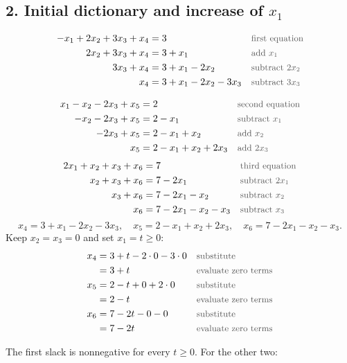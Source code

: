 \documentclass[a4paper,11pt]{article}
\newif\ifexplain
\newcommand{\teil}[1]{\subsection*{#1}}
\newcommand{\why}[1]{\text{\small\color{black!65}#1}}
\newcommand{\explain}[1]{\ifexplain\begin{erklbox}#1\end{erklbox}\fi}
\begin{document}
\teil{2. Initial dictionary and increase of $x_1$}
\begin{align*}
-x_1+2x_2+3x_3+x_4&=3&&\why{first equation}\\
2x_2+3x_3+x_4&=3+x_1&&\why{add $x_1$}\\
3x_3+x_4&=3+x_1-2x_2&&\why{subtract $2x_2$}\\
x_4&=3+x_1-2x_2-3x_3&&\why{subtract $3x_3$}
\end{align*}
\explain{Das Minus vor $x_1$ in der ursprünglichen Nebenbedingung wird beim Verschieben zum Plus. Wenn nur $x_1$ steigt, wächst also $x_4$. Diese erste Zeile begrenzt den Schritt nach oben nicht.}
\begin{align*}
x_1-x_2-2x_3+x_5&=2&&\why{second equation}\\
-x_2-2x_3+x_5&=2-x_1&&\why{subtract $x_1$}\\
-2x_3+x_5&=2-x_1+x_2&&\why{add $x_2$}\\
x_5&=2-x_1+x_2+2x_3&&\why{add $2x_3$}
\end{align*}
\begin{align*}
2x_1+x_2+x_3+x_6&=7&&\why{third equation}\\
x_2+x_3+x_6&=7-2x_1&&\why{subtract $2x_1$}\\
x_3+x_6&=7-2x_1-x_2&&\why{subtract $x_2$}\\
x_6&=7-2x_1-x_2-x_3&&\why{subtract $x_3$}
\end{align*}
\[\boxed{x_4=3+x_1-2x_2-3x_3,\quad x_5=2-x_1+x_2+2x_3,\quad x_6=7-2x_1-x_2-x_3.}\]
Keep $x_2=x_3=0$ and set $x_1=t\geq0$:
\begin{align*}
x_4&=3+t-2\cdot0-3\cdot0&&\why{substitute}\\
&=3+t&&\why{evaluate zero terms}\\
x_5&=2-t+0+2\cdot0&&\why{substitute}\\
&=2-t&&\why{evaluate zero terms}\\
x_6&=7-2t-0-0&&\why{substitute}\\
&=7-2t&&\why{evaluate zero terms}
\end{align*}
\explain{Jetzt ändern wir wirklich nur eine Variable. Für jede Basisvariable prüfen wir, ab welchem Wert von $t$ sie null wird. Die erste solche Schranke beendet den zulässigen Schritt. Das ist der Minimum-Ratio-Test aus der Vorlesung. Wir dürfen nicht die größere der beiden oberen Grenzen wählen, weil zu diesem Zeitpunkt die kleinere Grenze schon überschritten wäre und damit mindestens eine Basisvariable einen negativen Wert angenommen hätte.}
The first slack is nonnegative for every $t\geq0$. For the other two:
\end{document}
